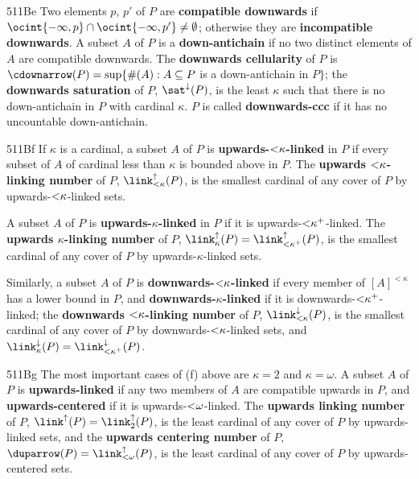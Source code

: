 \spheader 511Be Two elements $p$, $p'$ of $P$ are
{\bf compatible downwards} if
$\ocint{-\infty,p}\cap\ocint{-\infty,p'}\ne\emptyset$;  otherwise they are
{\bf incompatible downwards}.   A subset $A$ of $P$ is a
{\bf down-antichain} if no two
distinct elements of $A$ are compatible downwards.
The {\bf downwards cellularity} of $P$ is
$\cdownarrow(P)=\sup\{\#(A):A\subseteq P$ is a down-antichain in
$P\}$;  the {\bf downwards saturation} of $P$, $\sat^{\downarrow}(P)$,
is the least $\kappa$ such that there is no down-antichain in
$P$ with cardinal $\kappa$.   $P$ is called {\bf downwards-ccc} if it has
no uncountable down-antichain.

\spheader 511Bf If $\kappa$ is a cardinal, a subset $A$ of $P$ is
{\bf upwards-$\hbox{$<$}\kappa$-linked} in $P$ if every subset of $A$ of
cardinal less than $\kappa$ is bounded above in $P$.   The {\bf
upwards $\hbox{$<$}\kappa$-linking number} of $P$,
$\link_{<\kappa}^{\uparrow}(P)$, is the smallest
cardinal of any cover of $P$ by upwards-$\hbox{$<$}\kappa$-linked sets.

A subset $A$ of $P$ is {\bf upwards-$\kappa$-linked} in $P$ if it is
upwards-$\hbox{$<$}\kappa^+$-linked.   The {\bf
upwards $\kappa$-linking number} of $P$,
$\link_{\kappa}^{\uparrow}(P)=\link_{<\kappa^+}^{\uparrow}(P)$, is the
smallest cardinal of any cover of $P$ by upwards-$\kappa$-linked sets.

Similarly, a subset $A$ of $P$ is
{\bf downwards-$\hbox{$<$}\kappa$-linked} if every member of
$[A]^{<\kappa}$ has a lower bound in $P$, and
{\bf downwards-$\kappa$-linked} if it is
downwards-$\hbox{$<$}\kappa^+$-linked;  the
{\bf downwards $\hbox{$<$}\kappa$-linking number} of $P$,
$\link_{<\kappa}^{\downarrow}(P)$, is the smallest
cardinal of any cover of $P$ by
downwards-$\hbox{$<$}\kappa$-linked sets,
and $\link_{\kappa}^{\downarrow}(P)=\link_{<\kappa^+}^{\downarrow}(P)$.

\spheader 511Bg The most important cases of (f) above are $\kappa=2$ and
$\kappa=\omega$.   A subset $A$ of $P$ is {\bf upwards-linked} if any
two members of $A$ are compatible upwards in $P$, and
{\bf upwards-centered} if it is upwards-$\hbox{$<$}\omega$-linked.   The {\bf upwards linking number} of $P$,
$\link^{\uparrow}(P)=\link_2^{\uparrow}(P)$, is the least cardinal of any
cover of $P$ by upwards-linked sets, and the {\bf upwards centering
number} of $P$, $\duparrow(P)=\link_{<\omega}^{\uparrow}(P)$,
is the least cardinal of any cover of $P$ by upwards-centered sets.

